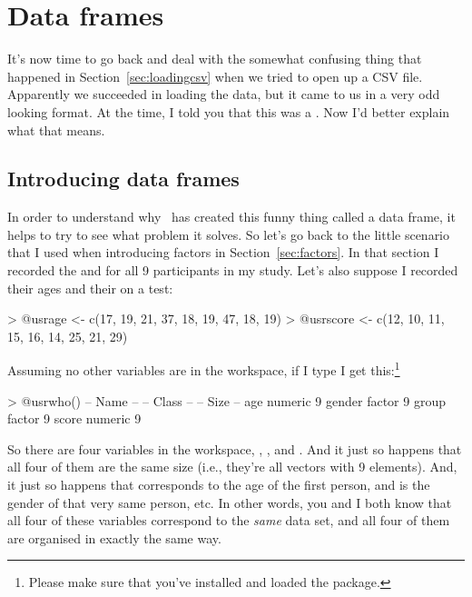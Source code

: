 %
%



\section{Data frames\label{sec:dataframes}}

It's now time to go back and deal with the somewhat confusing thing that happened in Section~\ref{sec:loadingcsv} when we tried to open up a CSV file. Apparently we succeeded in loading the data, but it came to us in a very odd looking format. At the time, I told you that this was a . Now I'd better explain what that means.



\subsection{Introducing data frames}

In order to understand why \R\ has created this funny thing called a data frame, it helps to try to see what problem it solves. So let's go back to the little scenario that I used when introducing factors in Section~\ref{sec:factors}. In that section I recorded the  and  for all 9 participants in my study. Let's also suppose I recorded their ages and their  on a test:
\begin{rblock1}
> @usr{age <- c(17, 19, 21, 37, 18, 19, 47, 18, 19)}
> @usr{score <- c(12, 10, 11, 15, 16, 14, 25, 21, 29)}
\end{rblock1}
Assuming no other variables are in the workspace, if I type  I get this:\footnote{Please make sure that you've installed and loaded the  package.}
\begin{rblock1}
> @usr{who()}
   -- Name --   -- Class --   -- Size --
   age          numeric       9         
   gender       factor        9         
   group        factor        9         
   score        numeric       9          
\end{rblock1}
So there are four variables in the workspace, , ,  and . And it just so happens that all four of them are the same size (i.e., they're all vectors with 9 elements). And, it just so happens that  corresponds to the age of the first person, and  is the gender of that very same person, etc. In other words, you and I both know that all four of these variables correspond to the {\it same} data set, and all four of them are organised in exactly the same way. 

